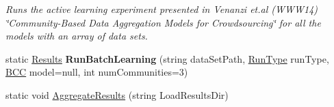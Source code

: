 \begin{DoxyCompactItemize}
\begin{DoxyCompactList}\small\item\em Runs the active learning experiment presented in Venanzi et.\+al (W\+W\+W14) \char`\"{}\+Community-\/\+Based Data Aggregation Models for Crowdsourcing\char`\"{} for all the models with an array of data sets. \end{DoxyCompactList}\item 
\hypertarget{class_crowdsourcing_models_1_1_active_crowd_toolkit_experiment_ad500aeddfb4cd4509e5575a6e4902779}{}static \hyperlink{class_crowdsourcing_models_1_1_results}{Results} {\bfseries Run\+Batch\+Learning} (string data\+Set\+Path, \hyperlink{namespace_crowdsourcing_models_ae187d0e1d9fe64e7ebcb9d948d02d2d0}{Run\+Type} run\+Type, \hyperlink{class_crowdsourcing_models_1_1_b_c_c}{B\+C\+C} model=null, int num\+Communities=3)\label{class_crowdsourcing_models_1_1_active_crowd_toolkit_experiment_ad500aeddfb4cd4509e5575a6e4902779}

\item 
static void \hyperlink{class_crowdsourcing_models_1_1_active_crowd_toolkit_experiment_aed18fc802fcb10cb4e36e1d87aa1f47f}{Aggregate\+Results} (string Load\+Results\+Dir)
\end{DoxyCompactItemize}
